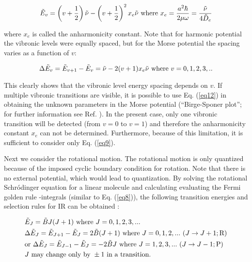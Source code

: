 \documentclass[byrevtex,amssymb,aps,pra,floatfix,letterpaper]{revtex4}
\begin{document}
\begin{equation}
\tilde{E}_v = \left(v + \frac{1}{2}\right)\tilde{\nu} - \left(v + \frac{1}{2}\right)^2x_e\tilde{\nu}\textnormal{ where }x_e = \frac{a^2\hbar}{2\mu\omega} = \frac{\tilde{\nu}}{4\tilde{D}_e}
\label{eq11}
\end{equation}

\noindent
where $x_e$ is called the anharmonicity constant. Note that for harmonic potential the vibronic levels were equally spaced, but for the Morse potential the spacing varies as a function of $v$:

\begin{equation}
\Delta\tilde{E}_v = \tilde{E}_{v+1} - \tilde{E}_v = \tilde{\nu} - 2(v + 1)x_e\tilde{\nu}\textnormal{ where }v = 0,1,2,3,..
\label{eq12}
\end{equation}

\noindent
This clearly shows that the vibronic level energy spacing depends on $v$. If multiple vibronic transitions are visible, it is possible to use Eq. (\ref{eq12}) in obtaining the unknown parameters in the Morse potential (``Birge-Sponer plot''; for further information see Ref. \cite{ATKINS1}). In the present case, only one vibronic transition will be detected (from $v = 0$ to $v = 1$) and therefore the anharmonicity constant $x_e$ can not be determined. Furthermore, because of this limitation, it is sufficient to consider only Eq. (\ref{eq9}).

Next we consider the rotational motion. The rotational motion is only quantized because of the imposed cyclic boundary condition for rotation. Note that there is no external potential, which would lead to quantization. By solving the rotational Schr\'odinger equation for a linear molecule and calculating evaluating the Fermi golden rule -integrals (similar to Eq. (\ref{eq8})), the following transition energies and selection rules for IR can be obtained \cite{ATKINS1,SILBEY}:

\begin{align}
\label{eq13}
& \tilde{E}_J = \tilde{B}J(J + 1)\textnormal{ where }J = 0,1,2,3,...\\
\notag
& \Delta\tilde{E}_J = \tilde{E}_{J+1} - \tilde{E}_J = 2\tilde{B}(J + 1)\textnormal{ where }J=0,1,2,...\textnormal{ }(J\rightarrow J+1;\textnormal{R})\\
\notag
& \textnormal{or }\Delta\tilde{E}_J = \tilde{E}_{J-1} - \tilde{E}_J = -2\tilde{B}J\textnormal{ where }J=1,2,3,...\textnormal{ }(J\rightarrow J-1;\textnormal{P})\\
\notag
& J\textnormal{ may change only by }\pm1\textnormal{ in a transition.}
\end{align}
\end{document}
